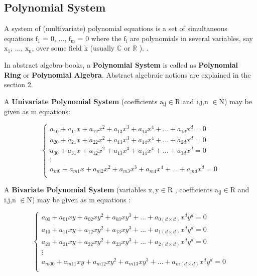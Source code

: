 \documentclass[11pt]{article}
\begin{document}
\subsection{Polynomial System}

A system of (multivariate) polynomial equations is a set of simultaneous equations $\mathrm{f_{1}}$  = 0, ..., $\mathrm{f_{m}}$ = 0 where the $\mathrm{f_{i}}$ are polynomials in several variables, say $\mathrm{x_{1}}$, ..., $\mathrm{x_{n}}$, over some field k (usually $\mathbb{C}$ or $\mathbb{R}$ ).
\cite{wikipediaSystemofPolynomialEquations}.

In abstract algebra books,  a \textbf{Polynomial System} is called as \textbf{Polynomial Ring} or \textbf{Polynomial Algebra}. \cite{wolframPolynomial} Abstract algebraic notions are explained in the section 2.

A \textbf{Univariate Polynomial System}  (coefficients  $\mathrm{a_{ij} \in R}$  and i,j,n $\mathrm{\in N}$) may be given as m equations:

\begin{equation}
   \begin{cases}
    a_{10}+a_{11}x+a_{12}x^2+a_{13}x^3+a_{14}x^4+\ldots+a_{1d}x^d=0 \\
    a_{20}+a_{21}x+a_{22}x^2+a_{13}x^3+a_{14}x^4+\ldots+a_{2d}x^d=0 \\
    a_{30}+a_{31}x+a_{12}x^2+a_{13}x^3+a_{14}x^4+\ldots+a_{3d}x^d=0 \\
    \vdots \\
    a_{m0}+a_{m1}x+a_{m2}x^2+a_{m3}x^3+a_{m4}x^4+\ldots+a_{md}x^d=0 \\
  \end{cases}
\end{equation}


A \textbf{Bivariate Polynomial System}  (variables  $\mathrm{x,y \in R}$ ,  coefficients  $\mathrm{a_{ij} \in R}$  and i,j,n $\mathrm{\in N}$) may be given as m equations :

\begin{equation}
   \begin{cases}
    a_{00}+a_{01}xy+a_{02}xy^2+a_{03}xy^3+\ldots+a_{0(d \times d)}x^dy^d=0 \\
    a_{10}+a_{11}xy+a_{12}xy^2+a_{13}xy^3+\ldots+a_{1(d \times d)}x^dy^d=0 \\
    a_{20}+a_{21}xy+a_{22}xy^2+a_{23}xy^3+\ldots+a_{2(d \times d)}x^dy^d=0 \\
    \vdots \\
    a_{m00}+a_{m11}xy+a_{m12}xy^2+a_{m13}xy^3+\ldots+a_{m(d \times d)}x^dy^d=0 \\
  \end{cases}
\end{equation}
\end{document}
